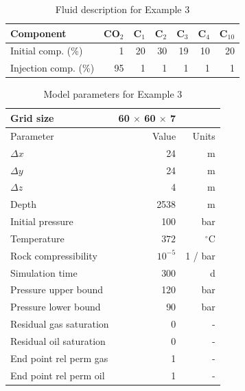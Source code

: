 \documentclass[twocolumn,numbook]{svjour3}          %
\begin{document}
\begin{table}
\centering
\caption{Fluid description for Example 3}
\begin{tabular}{|l|r|r|r|r|r|r|}
\hline
Component            & CO$_2$ & C$_1$ & C$_2$ & C$_3$ & C$_4$  & C$_{10}$ \\
\hline
Initial comp. (\%)   & 1    & 20  & 30  & 19  & 10   & 20     \\
Injection comp. (\%) & 95   &  1  &  1  &  1  &  1   &  1     \\
\hline
\end{tabular}
\label{table:VanEssenModelFluid}
\end{table}

\begin{table}
\centering
\caption{Model parameters for Example 3}
\begin{tabular}{|l|rr|}
\hline
Grid size                       & 60 $\times$ 60 $\times$ 7        &           \\
\hline\hline
Parameter                      & Value           & Units     \\
\hline
\hline
$\Delta x$                     & 24           & m            \\
$\Delta y$                     & 24           & m            \\
$\Delta z$                     &  4           & m            \\
Depth                          & 2538       & m            \\
Initial pressure               & 100          & bar          \\
Temperature                    & $372$     & $^\circ$C    \\
Rock compressibility           & $10^{-5}$    & 1 / bar      \\
Simulation time                & 300          & d            \\
Pressure upper bound           & 120          & bar          \\
Pressure lower bound           &  90          & bar          \\
\hline
Residual gas saturation  & 0 & -                             \\
Residual oil saturation  & 0 & -                             \\
End point rel perm gas   & 1 & -                             \\
End point rel perm oil   & 1 & -                             \\

\end{tabular}
\end{table}
\end{document}
